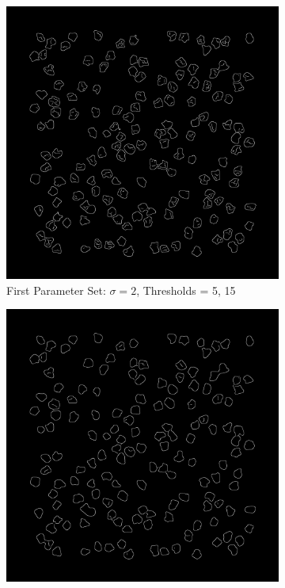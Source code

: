 \documentclass[%
	a4paper, %
	12pt, %
	english, %
	bibtotoc %
]{scrartcl}
\begin{document}
\begin{figure}[H]
    \centering
    \begin{subfigure}[b]{0.3\textwidth}
        \centering
        \includegraphics[width=\textwidth]{canny_edge_detection_1.png}
        \caption{First Parameter Set: \(\sigma = 2\), Thresholds = 5, 15}
        \label{fig:canny_edge_detection_img_1}
    \end{subfigure}
    \hspace{1cm} %
    \begin{subfigure}[b]{0.3\textwidth}
        \centering
        \includegraphics[width=\textwidth]{canny_edge_detection_2.png}

\end{subfigure}
\end{figure}
\end{document}
